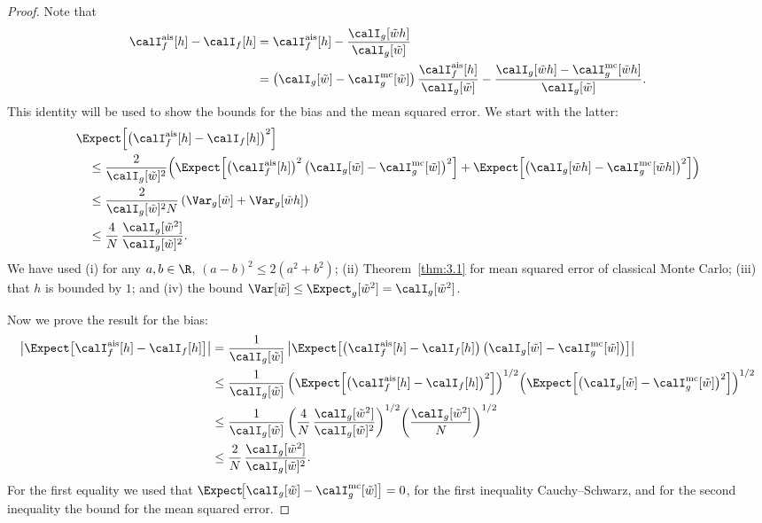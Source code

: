 \begin{proof}
Note that
\begin{align*}
  \calI_f^{\mathrm{ais}}[h] - \calI_f[h]
  &= \calI_f^{\mathrm{ais}}[h]
     - \frac{\calI_g[\tilde{w}h]}{\calI_g[\tilde{w}]} \\
  &= \left(\calI_g[\tilde{w}] - \calI_g^{\mathrm{mc}}[\tilde{w}]\right)
     \frac{\calI_f^{\mathrm{ais}}[h]}{\calI_g[\tilde{w}]}
     - \frac{\calI_g[\tilde{w}h] - \calI_g^{\mathrm{mc}}[\tilde{w}h]}%
            {\calI_g[\tilde{w}]}.
\end{align*}
This identity will be used to show the bounds for the bias and the mean squared
error. We start with the latter:
\begin{align*}
  &\Expect\!\left[\left(\calI_f^{\mathrm{ais}}[h] - \calI_f[h]\right)^2\right] \\
  &\quad\leq
  \frac{2}{\calI_g[\tilde{w}]^2}\!\left(
    \Expect\!\left[\left(\calI_f^{\mathrm{ais}}[h]\right)^2
      \left(\calI_g[\tilde{w}] - \calI_g^{\mathrm{mc}}[\tilde{w}]\right)^2\right]
    + \Expect\!\left[\left(\calI_g[\tilde{w}h] - \calI_g^{\mathrm{mc}}[\tilde{w}h]\right)^2\right]
  \right) \\
  &\quad\leq
  \frac{2}{\calI_g[\tilde{w}]^2 N}
  \left(\Var_g[\tilde{w}] + \Var_g[\tilde{w}h]\right) \\
  &\quad\leq
  \frac{4}{N}\,\frac{\calI_g[\tilde{w}^2]}{\calI_g[\tilde{w}]^2}.
\end{align*}
We have used (i) for any $a, b \in \R$, $(a-b)^2 \leq 2(a^2+b^2)$; (ii)
Theorem~\ref{thm:3.1} for mean squared error of classical Monte Carlo; (iii)
that $h$ is bounded by $1$; and (iv) the bound
$\Var[\tilde{w}] \leq \Expect_g[\tilde{w}^2] = \calI_g[\tilde{w}^2]$.

Now we prove the result for the bias:
\begin{align*}
  \left|\Expect\!\left[\calI_f^{\mathrm{ais}}[h] - \calI_f[h]\right]\right|
  &= \frac{1}{\calI_g[\tilde{w}]}
     \left|\Expect\!\left[
       \left(\calI_f^{\mathrm{ais}}[h] - \calI_f[h]\right)
       \left(\calI_g[\tilde{w}] - \calI_g^{\mathrm{mc}}[\tilde{w}]\right)
     \right]\right| \\
  &\leq
  \frac{1}{\calI_g[\tilde{w}]}
  \left(\Expect\!\left[\left(\calI_f^{\mathrm{ais}}[h] - \calI_f[h]\right)^2\right]\right)^{1/2}
  \!\left(\Expect\!\left[\left(\calI_g[\tilde{w}] - \calI_g^{\mathrm{mc}}[\tilde{w}]\right)^2\right]\right)^{1/2} \\
  &\leq
  \frac{1}{\calI_g[\tilde{w}]}
  \left(\frac{4}{N}\,\frac{\calI_g[\tilde{w}^2]}{\calI_g[\tilde{w}]^2}\right)^{1/2}
  \!\left(\frac{\calI_g[\tilde{w}^2]}{N}\right)^{1/2} \\
  &\leq
  \frac{2}{N}\,\frac{\calI_g[\tilde{w}^2]}{\calI_g[\tilde{w}]^2}.
\end{align*}
For the first equality we used that
$\Expect\!\bigl[\calI_g[\tilde{w}] - \calI_g^{\mathrm{mc}}[\tilde{w}]\bigr] = 0$,
for the first inequality Cauchy--Schwarz, and for the second inequality the bound
for the mean squared error.
\end{proof}

